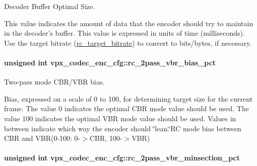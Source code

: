 Decoder Buffer Optimal Size. 

This value indicates the amount of data that the encoder should try to maintain in the decoder's buffer. This value is expressed in units of time (milliseconds). Use the target bitrate (\hyperlink{structvpx__codec__enc__cfg_ab8339685175d66710f482706cc9f0aed}{rc\+\_\+target\+\_\+bitrate}) to convert to bits/bytes, if necessary. \hypertarget{structvpx__codec__enc__cfg_a21c21ff097890dc3a450731c9b504cf4}{
\paragraph[{rc\+\_\+2pass\+\_\+vbr\+\_\+bias\+\_\+pct}]{\setlength{\rightskip}{0pt plus 5cm}unsigned int vpx\+\_\+codec\+\_\+enc\+\_\+cfg\+::rc\+\_\+2pass\+\_\+vbr\+\_\+bias\+\_\+pct}}\label{structvpx__codec__enc__cfg_a21c21ff097890dc3a450731c9b504cf4}


Two-\/pass mode C\+B\+R/\+V\+B\+R bias. 

Bias, expressed on a scale of 0 to 100, for determining target size for the current frame. The value 0 indicates the optimal C\+B\+R mode value should be used. The value 100 indicates the optimal V\+B\+R mode value should be used. Values in between indicate which way the encoder should \char`\"{}lean.\char`\"{}R\+C mode bias between C\+B\+R and V\+B\+R(0-\/100\+: 0-\/$>$C\+B\+R, 100-\/$>$V\+B\+R) \hypertarget{structvpx__codec__enc__cfg_a21eb9fce0844ae07b617bf3f0a25f5a5}{
\paragraph[{rc\+\_\+2pass\+\_\+vbr\+\_\+minsection\+\_\+pct}]{\setlength{\rightskip}{0pt plus 5cm}unsigned int vpx\+\_\+codec\+\_\+enc\+\_\+cfg\+::rc\+\_\+2pass\+\_\+vbr\+\_\+minsection\+\_\+pct}}\label{structvpx__codec__enc__cfg_a21eb9fce0844ae07b617bf3f0a25f5a5}


